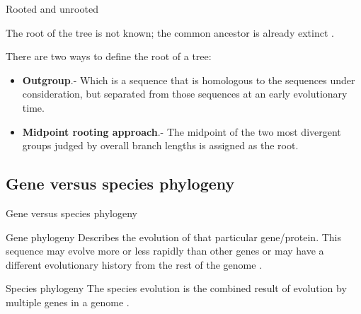 \documentclass[10pt]{beamer}
\newcommand{\1}{
	\setbeamertemplate{background}{
		\texttt{[image: img/1]}
		\tikz[overlay] \fill[fill opacity=0.75,fill=white] (0,0) rectangle (-\paperwidth,\paperheight);
	}
}
\begin{document}
\begin{frame}{Rooted and unrooted}{}
	\begin{block}{}
		The root of the tree is not known; the common ancestor is already
		extinct \cite{xiong2006essential}. 		
	\end{block}
	
	\begin{block}{}
		There are two ways to define the root of a tree:
		\begin{itemize}
			\item \textbf{Outgroup}.- Which is a sequence that is homologous to the sequences under consideration, but separated from those sequences at an early evolutionary time.
			\item \textbf{Midpoint rooting approach}.- The midpoint of the two most divergent groups
			judged by overall branch lengths is assigned as the root.
		\end{itemize} 
	\end{block}
\end{frame}

\subsection{Gene versus species phylogeny}

\begin{frame}{Gene versus species phylogeny}{}
	\begin{block}{Gene phylogeny}
		Describes the evolution of that particular gene/protein. This sequence
		may evolve more or less rapidly than other genes or may have a different evolutionary history from the rest of the genome \cite{xiong2006essential}. 		
	\end{block}

	\begin{block}{Species phylogeny}
		The species evolution is the combined result of evolution by multiple genes in a genome \cite{xiong2006essential}. 		
	\end{block}
\end{frame}
\end{document}
